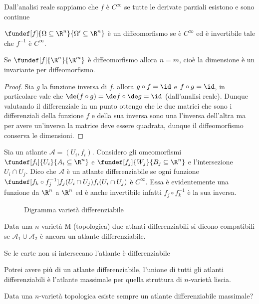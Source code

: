 \begin{defn}
Dall'analisi reale sappiamo che $f$ è $C^{\infty}$ se tutte le derivate parziali esistono e sono continue
\end{defn}
\begin{defn}[Diffeomorfismo]
$\fundef[f]{\Omega \subseteq \R^n}{\Omega' \subseteq \R^n}$ è un diffeomorfismo se è $C^\infty$ ed è invertibile tale che $f^{-1}$ è $C^{\infty}$.
\end{defn}
\begin{prop}
Se $\fundef[f]{\R^n}{\R^m}$ è diffeomorfismo allora $n = m$, cioè la dimensione è un invariante per diffeomorfismo.
\end{prop}
\begin{proof}
Sia $g$ la funzione inversa di $f$. allora $g \circ f = \id$ e $f \circ g = \id$, in particolare vale che $\de(f \circ g) = \de f \circ \de g = \id$ (dall'analisi reale). Dunque valutando il differenziale in un punto ottengo che le due matrici che sono i differenziali della funzione $f$ e della sua inversa sono una l'inversa dell'altra ma per avere un'inversa la matrice deve essere quadrata, dunque il diffeomorfismo conserva le dimensioni.
\end{proof}
\begin{defn}
Sia un atlante $\mathcal{A} = {(U_i, f_i)}$. Considero gli omeomorfismi
$\fundef[f_i]{U_i}{A_i \subseteq \R^n }$ e $\fundef[f_j]{W_j}{B_j\subseteq \R^n}$ e l'intersezione 
$U_i \cap U_j$. Dico che $\mathcal{A}$ è un atlante differenziabile se ogni funzione $\fundef[f_k \circ f_j^{-1}]{f_j(U_i \cap U_j)}{f_i(U_i \cap U_j)}$ è $C^{\infty}$. Essa è evidentemente una funzione da $\R^n$ a $\R^n$ ed è anche invertibile infatti $f_j \circ f_k^{-1}$ è la sua inversa.
\end{defn}

\begin{figure}
    \centering %
    
    \caption{Digramma varietà differenziabile}
\end{figure}

\begin{defn} 
Data una $n$-varietà M (topologica) due atlanti differenziabili si dicono compatibili se $\mathcal{A}_1 \cup \mathcal{A}_2$ è ancora un atlante differenziabile.
\end{defn}
\begin{oss}
Se le carte non si intersecano l'atlante è differenziabile
\end{oss}
\begin{oss}
Potrei avere più di un atlante differenziabile, l'unione di tutti gli atlanti differenziabili è l'atlante massimale per quella struttura di $n$-varietà liscia.
\end{oss}
\begin{oss}
Data una $n$-varietà topologica esiste sempre un atlante differenziabile massimale?
\end{oss}